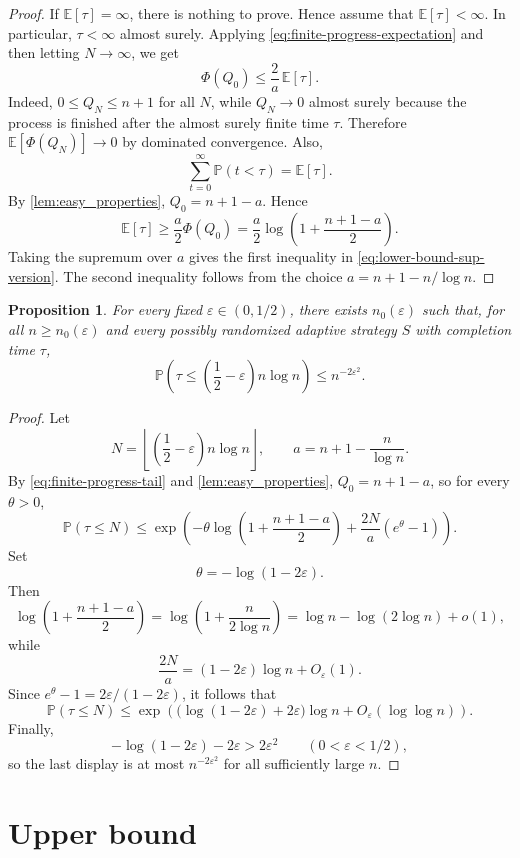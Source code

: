\documentclass[11pt,reqno,letterpaper]{amsart}
\newtheorem{proposition}[theorem]{Proposition}
\theoremstyle{definition}
\numberwithin{equation}{section}
\newcommand{\E}{\mathbb{E}}
\renewcommand{\P}{\mathbb{P}}
\newcommand{\eps}{\varepsilon}
\begin{document}
\begin{proof}
If \(\E[\tau]=\infty\), there is nothing to prove.  Hence assume that
\(\E[\tau]<\infty\).  In particular, \(\tau<\infty\) almost surely. Applying \eqref{eq:finite-progress-expectation} and then letting \(N\to\infty\), we get
\[
\Phi(Q_0)
\le
\frac2a\,\E[\tau].
\]
Indeed, \(0\le Q_N\le n+1\) for all \(N\), while \(Q_N\to0\) almost surely because
the process is finished after the almost surely finite time \(\tau\).  Therefore
\(\E[\Phi(Q_N)]\to0\) by dominated convergence.  Also,
\[
\sum_{t=0}^\infty \P(t<\tau)=\E[\tau].
\]
By \cref{lem:easy_properties}, \(Q_0=n+1-a\).  Hence
\[
\E[\tau]
\ge
\frac a2 \Phi(Q_0)
=
\frac a2
\log\left(1+\frac{n+1-a}{2}\right).
\]
Taking the supremum over $a$ gives the first inequality in \eqref{eq:lower-bound-sup-version}. The second inequality follows from the choice $a = n+1 - n/\log n$.
\end{proof}

\begin{proposition}\label{prop:hp-lower}
For every fixed \(\eps\in(0,1/2)\), there exists \(n_0(\eps)\) such that, for all
\(n\ge n_0(\eps)\) and every possibly randomized adaptive strategy \(S\) with
completion time \(\tau\),
\[
\P\left(\tau\le \left(\frac12-\eps\right)n\log n\right)
\le
n^{-2\eps^2}.
\]
\end{proposition}

\begin{proof}
Let
\[
N=\left\lfloor\left(\frac12-\eps\right)n\log n\right\rfloor,
\qquad
a=n+1-\frac{n}{\log n}.
\]
By \eqref{eq:finite-progress-tail} and \cref{lem:easy_properties}, \(Q_0=n+1-a\), so
for every \(\theta>0\),
\[
\P(\tau\le N)
\le
\exp\left(
-\theta\log\left(1+\frac{n+1-a}{2}\right)
+
\frac{2N}{a}(e^\theta-1)
\right).
\]
Set
\[
\theta=-\log(1-2\eps).
\]
Then
\[
\log\left(1+\frac{n+1-a}{2}\right)
=
\log\left(1+\frac{n}{2\log n}\right)
=
\log n - \log(2\log n) + o(1),
\]
while
\[
\frac{2N}{a}
=
(1-2\eps)\log n+O_\eps(1).
\]
Since \(e^\theta-1=2\eps/(1-2\eps)\), it follows that
\[
\P(\tau\le N)
\le
\exp\left(
\bigl(\log(1-2\eps)+2\eps\bigr)\log n
+
O_\eps(\log\log n)
\right).
\]
Finally,
\[
-\log(1-2\eps)-2\eps>2\eps^2
\qquad (0<\eps<1/2),
\]
so the last display is at most \(n^{-2\eps^2}\) for all sufficiently large \(n\).
\end{proof}





\section{Upper bound}\label{sec:upper}
\end{document}
